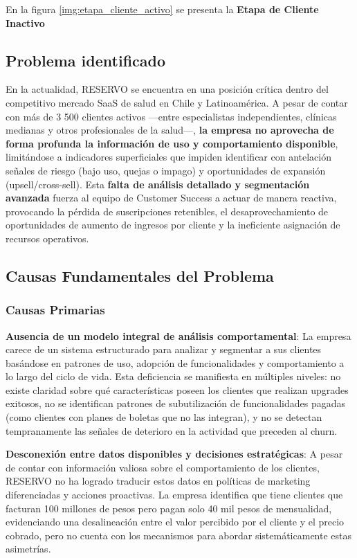 En la figura \ref{img:etapa_cliente_activo} se presenta la \textbf{Etapa de Cliente Inactivo}

\subsection{Problema identificado}

En la actualidad, RESERVO se encuentra en una posición crítica dentro del competitivo mercado SaaS de salud en Chile y Latinoamérica. A pesar de contar con más de 3 500 clientes activos —entre especialistas independientes, clínicas medianas y otros profesionales de la salud—, \textbf{la empresa no aprovecha de forma profunda la información de uso y comportamiento disponible}, limitándose a indicadores superficiales que impiden identificar con antelación señales de riesgo (bajo uso, quejas o impago) y oportunidades de expansión (upsell/cross-sell). Esta \textbf{falta de análisis detallado y segmentación avanzada} fuerza al equipo de Customer Success a actuar de manera reactiva, provocando la pérdida de suscripciones retenibles, el desaprovechamiento de oportunidades de aumento de ingresos por cliente y la ineficiente asignación de recursos operativos.


\subsection{Causas Fundamentales del Problema}

\subsubsection{Causas Primarias}

\textbf{Ausencia de un modelo integral de análisis comportamental}: La empresa carece de un sistema estructurado para analizar y segmentar a sus clientes basándose en patrones de uso, adopción de funcionalidades y comportamiento a lo largo del ciclo de vida. Esta deficiencia se manifiesta en múltiples niveles: no existe claridad sobre qué características poseen los clientes que realizan upgrades exitosos, no se identifican patrones de subutilización de funcionalidades pagadas (como clientes con planes de boletas que no las integran), y no se detectan tempranamente las señales de deterioro en la actividad que preceden al churn.

\textbf{Desconexión entre datos disponibles y decisiones estratégicas}: A pesar de contar con información valiosa sobre el comportamiento de los clientes, RESERVO no ha logrado traducir estos datos en políticas de marketing diferenciadas y acciones proactivas. La empresa identifica que tiene clientes que facturan 100 millones de pesos pero pagan solo 40 mil pesos de mensualidad, evidenciando una desalineación entre el valor percibido por el cliente y el precio cobrado, pero no cuenta con los mecanismos para abordar sistemáticamente estas asimetrías.


